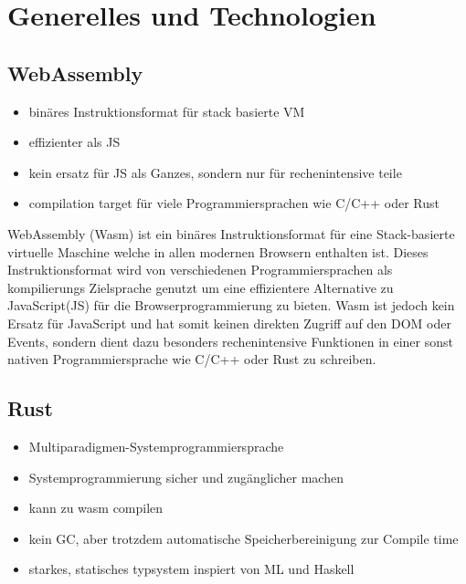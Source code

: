 \section {Generelles und Technologien}

\subsection{WebAssembly}

\begin{itemize}
  \item binäres Instruktionsformat für stack basierte VM
  \item effizienter als JS
  \item kein ersatz für JS als Ganzes, sondern nur für rechenintensive teile
  \item compilation target für viele Programmiersprachen wie C/C++ oder Rust
\end{itemize}

WebAssembly (Wasm) ist ein binäres Instruktionsformat für eine Stack-basierte virtuelle Maschine welche in allen modernen Browsern enthalten ist.
Dieses Instruktionsformat wird von verschiedenen Programmiersprachen als kompilierungs Zielsprache genutzt um eine effizientere Alternative zu JavaScript(JS) für die Browserprogrammierung zu bieten.
Wasm ist jedoch kein Ersatz für JavaScript und hat somit keinen direkten Zugriff auf den DOM oder Events, sondern dient dazu besonders rechenintensive Funktionen in einer sonst nativen Programmiersprache wie C/C++ oder Rust zu schreiben.

\subsection{Rust}

\begin{itemize}
  \item Multiparadigmen-Systemprogrammiersprache
  \item Systemprogrammierung sicher und zugänglicher machen
  \item kann zu wasm compilen
  \item kein GC, aber trotzdem automatische Speicherbereinigung zur Compile time
  \item starkes, statisches typsystem inspiert von ML und Haskell
\end{itemize}

